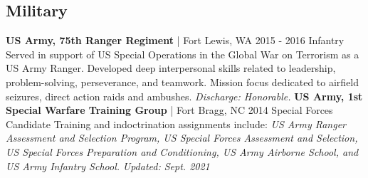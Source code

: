 \documentclass{article}
\begin{document}
\begin{bgbox}[
        height = \paperheight,
        width = 0.69\textwidth,
        colback = white
    ]
{            \section*{Military}
                \textbf{US Army, 75th Ranger Regiment} | Fort Lewis, WA \hfill{2015 - 2016}\newline
                        Infantry\newline\newline
                            Served in support of US Special Operations in the Global War on Terrorism as a US Army Ranger. Developed deep interpersonal skills related to leadership, problem-solving, perseverance, and teamwork. Mission focus dedicated to airfield seizures, direct action raids and ambushes. \textit{Discharge: Honorable.}\newline\newline
                \textbf{US Army, 1st Special Warfare Training Group} | Fort Bragg, NC \hfill{2014}\newline
                        Special Forces Candidate\newline\newline
                            Training and indoctrination assignments include: \textit{US Army Ranger Assessment and Selection Program, US Special Forces Assessment and Selection, US Special Forces Preparation and Conditioning, US Army Airborne School, and US Army Infantry School.}\newline
            \mbox{}
            \vfill
            \hfill{}\textit{Updated: Sept. 2021}
        }
    \end{bgbox}
\end{document}
